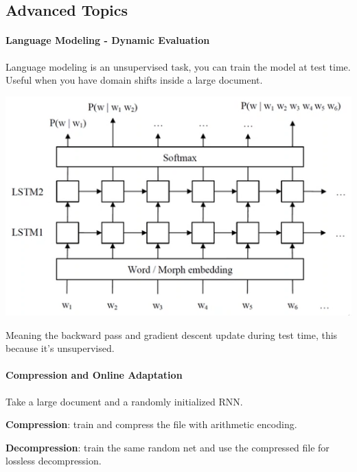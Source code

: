 \documentclass[10pt]{report}
\begin{document}
\subsection{Advanced Topics} 
\paragraph{Language Modeling - Dynamic Evaluation} Language modeling is an unsupervised task, you can train the model at test time. Useful when you have domain shifts inside a large document.
\begin{center}
	\includegraphics[scale=0.5]{105.png}
\end{center}
Meaning the backward pass and gradient descent update during test time, this because it's unsupervised.
\paragraph{Compression and Online Adaptation} Take a large document and a randomly initialized RNN.
\begin{list}{}{}
	\item \textbf{Compression}: train and compress the file with arithmetic encoding.
	\item \textbf{Decompression}: train the same random net and use the compressed file for lossless decompression.
\end{list}
\end{document}
